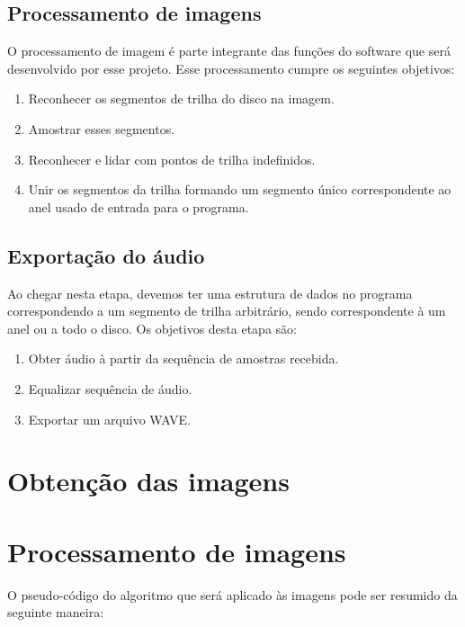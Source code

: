 \documentclass[
	12pt,				%
	openright,			%
	twoside,			%
	a4paper,			%
	english,			%
	french,				%
	spanish,			%
	brazil				%
	]{abntex2}
\begin{document}
\section{Processamento de imagens}
O processamento de imagem é parte integrante das funções do software que será desenvolvido por esse projeto. Esse processamento cumpre os seguintes objetivos:
\begin{enumerate}
\item Reconhecer os segmentos de trilha do disco na imagem.
\item Amostrar esses segmentos.
\item Reconhecer e lidar com pontos de trilha indefinidos.
\item Unir os segmentos da trilha formando um segmento único correspondente ao anel usado de entrada para o programa.
\end{enumerate}

\section{Exportação do áudio}
Ao chegar nesta etapa, devemos ter uma estrutura de dados no programa correspondendo a um segmento de trilha arbitrário, sendo correspondente à um anel ou a todo o disco. Os objetivos desta etapa são:
\begin{enumerate}
\item Obter áudio à partir da sequência de amostras recebida.
\item Equalizar sequência de áudio.
\item Exportar um arquivo WAVE.
\end{enumerate}



\chapter{Obtenção das imagens}

\chapter{Processamento de imagens}
O pseudo-código do algoritmo que será aplicado às imagens pode ser resumido da seguinte maneira:
\end{document}
